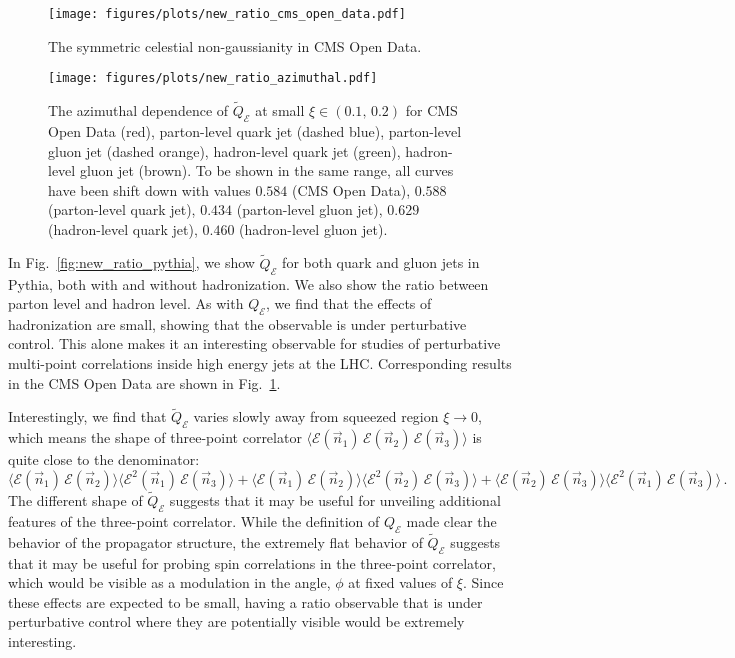 \documentclass[letterpaper,11pt]{article}
\def\Fig#1{Fig.~{\ref{#1}}}
\def\to{\rightarrow}
\DeclareRobustCommand{\Fig}[1]{Fig.~\ref{#1}}
\begin{document}
\begin{figure}[t]
\begin{center}
\texttt{[image: figures/plots/new\_ratio\_cms\_open\_data.pdf]}
\caption{The symmetric celestial non-gaussianity in CMS Open Data.
} 
\label{fig:new_ratior_cms}
\end{center}
\end{figure}

\begin{figure}[t]
\begin{center}
\texttt{[image: figures/plots/new\_ratio\_azimuthal.pdf]}
\caption{
The azimuthal dependence of $\widetilde{Q}_{\mathcal{E}}$ at small $\xi \in (0.1,\, 0.2)$ for CMS Open Data (red), parton-level quark jet (dashed blue), parton-level gluon jet (dashed orange), hadron-level quark jet (green), hadron-level gluon jet (brown). To be shown in the same range, all curves have been shift down with values $0.584$ (CMS Open Data), $0.588$ (parton-level quark jet), $0.434$ (parton-level gluon jet), $0.629$ (hadron-level quark jet), $0.460$ (hadron-level gluon jet).
} 
\label{fig:new_ratior_azimuthal}
\end{center}
\end{figure}


In \Fig{fig:new_ratio_pythia}, we show $\widetilde{Q}_{\mathcal{E}}$ for both quark and gluon jets in Pythia, both with and without hadronization.
%
We also show the ratio between parton level and hadron level.
%
As with $Q_{\mathcal{E}}$, we find that the effects of hadronization are small, showing that the observable is under perturbative control.
%
This alone makes it an interesting observable for studies of perturbative  multi-point correlations inside high energy jets at the LHC.
%
Corresponding results in the CMS Open Data are shown in \Fig{fig:new_ratior_cms}.


Interestingly, we find that $\widetilde{Q}_{\mathcal{E}}$ varies slowly away from squeezed region $\xi \to 0$, which means the shape of three-point correlator $\langle\mathcal{E}(\vec{n}_1)\, \mathcal{E}(\vec{n}_2)\, \mathcal{E}(\vec{n}_3)\rangle$ is quite close to the denominator:
\begin{equation}
\langle\mathcal{E}(\vec{n}_1)\, \mathcal{E}(\vec{n}_2)\rangle  \langle\mathcal{E}^2(\vec{n}_1)\, \mathcal{E}(\vec{n}_3)\rangle
+\langle\mathcal{E}(\vec{n}_1)\, \mathcal{E}(\vec{n}_2)\rangle   \langle\mathcal{E}^2(\vec{n}_2)\, \mathcal{E}(\vec{n}_3)\rangle
+\langle\mathcal{E}(\vec{n}_2)\, \mathcal{E}(\vec{n}_3)\rangle  \langle\mathcal{E}^2(\vec{n}_1)\, \mathcal{E}(\vec{n}_3)\rangle \,.
\end{equation}
%
The different shape of $\widetilde{Q}_{\mathcal{E}}$ suggests that it may be useful for unveiling additional features of the three-point correlator.
%
While the definition of $Q_{\mathcal{E}}$ made clear the behavior of the propagator structure, the extremely flat behavior of $\widetilde{Q}_{\mathcal{E}}$ suggests that it may be useful for probing spin correlations in the three-point correlator, which would be visible as a modulation in the angle, $\phi$ at fixed values of $\xi$.
%
Since these effects are expected to be small, having a ratio observable that is under perturbative control where they are potentially visible would be extremely interesting.
\end{document}
